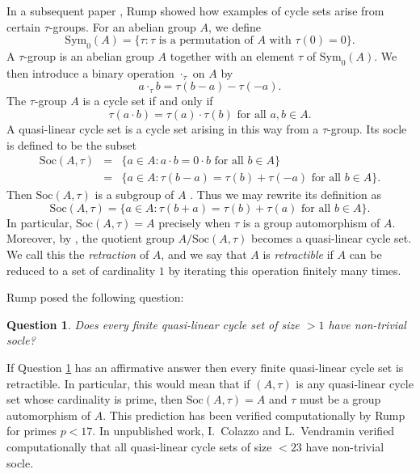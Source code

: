 \documentclass[letterpaper,12pt]{amsart}
\numberwithin{equation}{section}
\numberwithin{algorithm}{section}
\newtheorem{question}[lemma]{Question}
\theoremstyle{definition}
\newcommand{\Soc}{\mathrm{Soc}}
\newcommand{\Symo}{\mathrm{Sym}_0}
\begin{document}
In a subsequent paper \cite{Rump16}, Rump showed how examples of cycle sets arise from certain $\tau$-groups. For an abelian group $A$, we define
\begin{equation} \label{symo}
	 \Symo(A)=\{ \tau: \tau \mbox{ is a permutation of $A$ with } \tau(0)=0 \}. 
\end{equation} 
A $\tau$-group is an abelian group $A$ together with an element $\tau$ of $\Symo(A)$. We then introduce a binary operation $\cdot_\tau$ on $A$ by 
\begin{equation} \label{def-dot}
	a \cdot_\tau b = \tau(b-a) - \tau(-a). 
\end{equation} 	
The $\tau$-group $A$ is a cycle set if and only if 
\begin{equation}  \label{tau-autom}
	\tau(a \cdot b) = \tau(a) \cdot \tau(b) \mbox{ for all } a, b \in A. 
\end{equation}
A quasi-linear cycle set \cite[Definition 3]{Rump16} is a cycle set arising in this way from a $\tau$-group. Its socle is defined to be the subset
\begin{eqnarray*} 
	\Soc(A,\tau) & = & \{ a \in A : a \cdot b = 0 \cdot b \mbox{ for all } b \in A \} \\
	& = & \{ a \in A : \tau(b-a)=\tau(b) + \tau(-a) \mbox{ for all } b \in A \}.
\end{eqnarray*}
Then $\Soc(A,\tau)$ is a subgroup of $A$ \cite[Proposition 5]{Rump16}. Thus we may rewrite its definition as 
\begin{equation} \label{def-soc} 
  \Soc(A,\tau) =  \{ a \in A : \tau(b+a)=\tau(b) + \tau(a) \mbox{ for all } b \in A \}.
\end{equation} 
In particular, $\Soc(A,\tau)=A$ precisely when $\tau$ is a group automorphism of $A$. 
Moreover, by \cite[Proposition 12]{Rump16}, the quotient group $A/\Soc(A,\tau)$ becomes a quasi-linear cycle set. We call this the {\em retraction} of $A$, and we say that $A$ is {\em retractible} if $A$ can be reduced to a set of cardinality $1$ by iterating this operation finitely many times.

Rump \cite[Problem 2]{Rump16} posed the following question:

\begin{question} \label{Rump-qn}
	Does every finite quasi-linear cycle set of size $>1$ have non-trivial socle?
\end{question}

If Question \ref{Rump-qn} has an affirmative answer then every finite quasi-linear cycle set is
retractible. In particular, this would mean that if $(A,\tau) $ is any
quasi-linear cycle set whose cardinality is prime, then $\Soc(A,\tau)=A$ and $\tau$ must be a group automorphism of $A$. This prediction has been verified computationally by Rump for primes $p<17$. In unpublished work, I.~Colazzo and L.~Vendramin verified computationally that all quasi-linear cycle sets of size $<23$ have non-trivial socle. 
\end{document}
